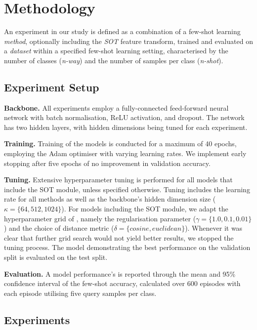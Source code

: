 \section{Methodology}

An experiment in our study is defined as a combination of a few-shot learning \textit{method}, optionally including the \textit{SOT} feature transform, trained and evaluated on a \textit{dataset} within 
a specified few-shot learning setting, characterised by the number of classes (\textit{n-way}) and the number of samples per class (\textit{n-shot}).

\subsection{Experiment Setup}

\textbf{Backbone.} All experiments employ a fully-connected feed-forward neural network with batch normalisation, ReLU activation, and dropout. 
The network has two hidden layers, with hidden dimensions being tuned for each experiment.

\textbf{Training.} Training of the models is conducted for a maximum of 40 epochs, employing the Adam optimiser with varying learning rates. 
We implement early stopping after five epochs of no improvement in validation accuracy. 

\textbf{Tuning.} Extensive hyperparameter tuning is performed for all models that include the SOT module, unless specified otherwise. Tuning includes the learning rate  for all methods as well as the backbone's hidden dimension size ($\kappa = \{64, 512, 1024\}$). For models including the SOT module, we adapt the hyperparameter grid of \citeauthor{sot}, namely the regularisation parameter ($\gamma = \{1.0, 0.1, 0.01\}$) and the choice of distance metric ($\delta = \{cosine, euclidean\}$). Whenever it was clear that further grid search would not yield better results, we stopped the tuning process. The model demonstrating the best performance on the validation split is evaluated on the test split. 

\textbf{Evaluation.} A model performance's is reported through the mean and 95\% confidence interval of the few-shot accuracy, calculated over 600 episodes with each episode utilising five query samples per class.

\subsection{Experiments}

